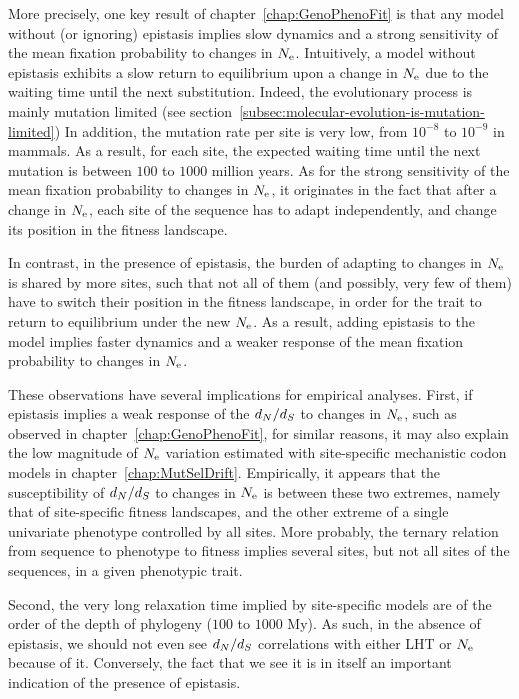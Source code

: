 More precisely, one key result of chapter~\ref{chap:GenoPhenoFit} is that any model without (or ignoring) epistasis implies slow dynamics and a strong sensitivity of the mean fixation probability to changes in $N_{\text{e}}$.
Intuitively, a model without epistasis exhibits a slow return to equilibrium upon a change in $N_{\text{e}}$ due to the waiting time until the next substitution.
Indeed, the evolutionary process is mainly mutation limited (see section~\ref{subsec:molecular-evolution-is-mutation-limited})
In addition, the mutation rate per site is very low, from $10^{-8}$ to $10^{-9}$ in mammals.
As a result, for each site, the expected waiting time until the next mutation is between $100$ to $1000$ million years.
As for the strong sensitivity of the mean fixation probability to changes in $N_{\text{e}}$, it originates in the fact that after a change in $N_{\text{e}}$, each site of the sequence has to adapt independently, and change its position in the fitness landscape.

In contrast, in the presence of epistasis, the burden of adapting to changes in $N_{\text{e}}$ is shared by more sites, such that not all of them (and possibly, very few of them) have to switch their position in the fitness landscape, in order for the trait to return to equilibrium under the new $N_{\text{e}}$.
As a result, adding epistasis to the model implies faster dynamics and a weaker response of the mean fixation probability to changes in $N_{\text{e}}$.

These observations have several implications for empirical analyses.
First, if epistasis implies a weak response of the $d_N / d_S$ to changes in $N_{\text{e}}$, such as observed in chapter~\ref{chap:GenoPhenoFit}, for similar reasons, it may also explain the low magnitude of $N_{\text{e}}$ variation estimated with site-specific mechanistic codon models in chapter~\ref{chap:MutSelDrift}.
Empirically, it appears that the susceptibility of $d_N / d_S$ to changes in $N_{\text{e}}$ is between these two extremes, namely that of site-specific fitness landscapes, and the other extreme of a single univariate phenotype controlled by all sites.
More probably, the ternary relation from sequence to phenotype to fitness implies several sites, but not all sites of the sequences, in a given phenotypic trait.

Second, the very long relaxation time implied by site-specific models are of the order of the depth of phylogeny ($100$ to $1000$ My).
As such, in the absence of epistasis, we should not even see $d_N / d_S$ correlations with either \acrshort{LHT} or $N_{\text{e}}$ because of it.
Conversely, the fact that we see it is in itself an important indication of the presence of epistasis.

